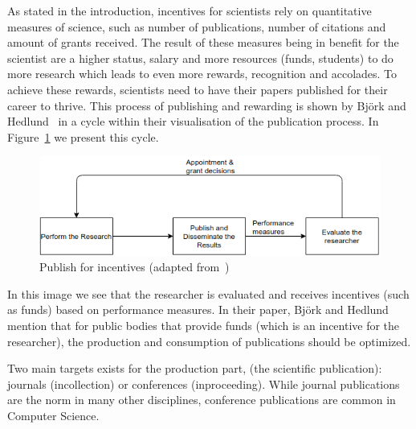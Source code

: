\documentclass{ou-report}
\newcommand{\todo}[1]{{\color{red} TODO: #1}}
\begin{document}
As stated in the introduction, incentives for scientists rely on quantitative measures of science, such as 
number of publications, number of citations and amount of grants received. The
result of these measures being in benefit for the scientist are a higher status, 
salary and more resources (funds, students) to do 
more research which leads to even more rewards, recognition and accolades. To 
achieve these rewards, scientists need to have their papers published for their 
career to thrive. This process of publishing and rewarding is shown by Bj\"ork 
and Hedlund~\cite{BH2004} in a cycle within their visualisation of the 
publication process. In Figure~\ref{fig:publish_incentives} we present this 
cycle.

\begin{figure}[H]
\centering
\includegraphics[width=12cm]{images/publication_process.drawio.png}
\caption{Publish for incentives (adapted from~\cite{BH2004})}
\label{fig:publish_incentives}
\end{figure}

In this image we see that the researcher is evaluated and receives incentives 
(such as funds) based on performance measures. In their paper,  Bj\"ork and 
Hedlund mention that for public bodies that provide funds (which is an incentive 
for the researcher), the production and consumption of publications should be 
optimized.
    


Two main targets exists for the production part, (the scientific publication): 
journals (incollection) or 
conferences (inproceeding). While journal publications are the norm in many 
other disciplines, conference publications are common in Computer Science.
\end{document}

